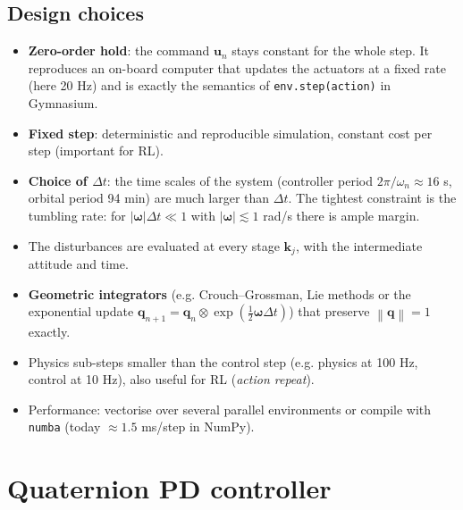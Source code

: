 \documentclass[11pt,a4paper]{article}
\newcommand{\vect}[1]{\bm{#1}}
\newcommand{\w}{\vect{\omega}}
\newcommand{\q}{\vect{q}}
\newcommand{\norm}[1]{\left\lVert #1 \right\rVert}
\newcommand{\code}[1]{\texttt{#1}}
\begin{document}
\subsection{Design choices}
\begin{itemize}
  \item \textbf{Zero-order hold}: the command $\vect u_n$ stays constant for the
        whole step. It reproduces an on-board computer that updates the
        actuators at a fixed rate (here 20 Hz) and is exactly the semantics of
        \code{env.step(action)} in Gymnasium.
  \item \textbf{Fixed step}: deterministic and reproducible simulation, constant
        cost per step (important for RL).
  \item \textbf{Choice of $\Delta t$}: the time scales of the system (controller
        period $2\pi/\omega_n\approx 16$ s, orbital period 94 min)
        are much larger than $\Delta t$. The tightest constraint is the
        tumbling rate: for $|\w|\Delta t \ll 1$ with
        $|\w|\lesssim 1$ rad/s there is ample margin.
  \item The disturbances are evaluated at every stage $\vect k_j$, with the
        intermediate attitude and time.
\end{itemize}

\begin{improvement}
\begin{itemize}[nosep]
  \item \textbf{Geometric integrators} (e.g. Crouch--Grossman, Lie methods
        or the exponential update $\q_{n+1} = \q_n\otimes\exp(\tfrac12\w\Delta t)$)
        that preserve $\norm{\q}=1$ exactly.
  \item Physics sub-steps smaller than the control step (e.g. physics at
        100 Hz, control at 10 Hz), also useful for RL (\emph{action repeat}).
  \item Performance: vectorise over several parallel environments or compile
        with \code{numba} (today $\approx1.5$ ms/step in NumPy).
\end{itemize}
\end{improvement}

\section{Quaternion PD controller}\label{sec:pd}
\end{document}
